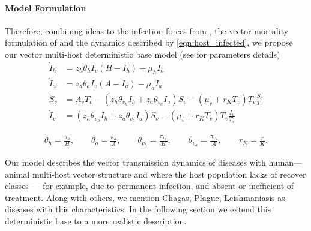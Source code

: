 \paragraph{Model Formulation}
Therefore, combining ideas to the infection forces from \cite{Crawford2014},
the vector mortality formulation of \cite{Mena-Lorca2006} and the dynamics
described by \eqref{eqn:host_infected}, we propose our vector multi-host
deterministic base model (see  for parameters 
details)
\begin{equation}\label{eq.1}
	\begin{aligned}
		\dot{I}_{h} &= z_{h}\theta_{h}I_{v}\left(H-I_{h}\right)-\mu_{h}I_{h}\\
		\dot{I}_{a} &= z_{a}\theta_{a}I_{v}\left(A-I_{a}\right)-\mu_{a}I_{a}\\
		\dot{S}_{v} &= \Lambda_{v}
			T_{v}-
			\left(
				z_{h}\theta_{v_{h}}I_{h}+z_{a}\theta_{v_{a}}I_{a}
			\right)S_{v}
			-(\mu_v+r_K T_v) T_v \frac{S_{v}}{T_{v}}
			\\
			\dot{I}_{v} &= 
			\left(
				z_{h}\theta_{v_{h}}I_{h}
				+z_{a}\theta_{v_{a}} I_{a}
			\right)S_{v}
			-
			(\mu_v + r_K T_v)T_v
			\frac{I_{v}}{T_{v}}
\end{aligned}
\end{equation}

\begin{align*}
	\theta_{h}=\frac{\pi_{h}}{H}, \qquad
	\theta_{a}=\frac{\pi_{a}}{A}, \qquad
	\theta_{v_{h}}=\frac{\pi_{v_{h}}}{H}, \qquad
	\theta_{v_{a}}=\frac{\pi_{v_{a}}}{A},\qquad
	r_K =\frac{r}{K}.
\end{align*}

	Our model describes the vector transmission dynamics of diseases with 
human---animal multi-host vector structure and where the host population lacks
of recover classes --- for example, due to permanent infection, and  absent or 
inefficient of treatment.
Along with others, we mention Chagas, Plague, Leishmaniasis
\cite{Alvar2012, Cruz-Pacheco2012a, singh2013animal} as diseases
with this characteristics. In the following 
section we extend this deterministic base to a more realistic description.
%

